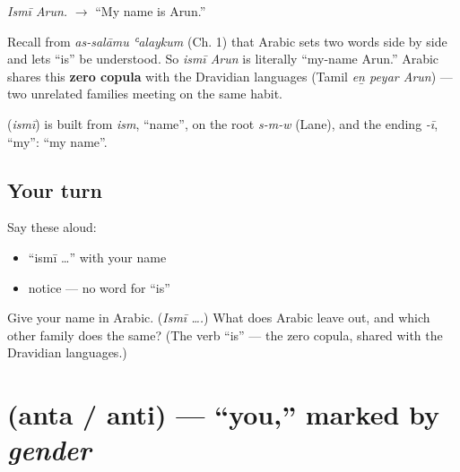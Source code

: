 \emph{Ismī Arun.} $\to$ \textquotedblleft{}My name is Arun.\textquotedblright{}

\begin{grammarlens}[title={Grammar Lens: no word for \textquotedblleft{}is\textquotedblright{} — again}]
Recall from \emph{as-salāmu ʿalaykum} (Ch. 1) that Arabic sets two words side by side and lets \textquotedblleft{}is\textquotedblright{} be understood. So \emph{ismī Arun} is literally \textquotedblleft{}my-name Arun.\textquotedblright{} Arabic shares this \textbf{zero copula} with the Dravidian languages (Tamil \emph{eṉ peyar Arun}) — two unrelated families meeting on the same habit.
\end{grammarlens}

\begin{cousinweb}
\textbf{} (\emph{ismī}) is built from \emph{ism}, \textquotedblleft{}name\textquotedblright{}, on the root \emph{s-m-w} (Lane), and the ending \emph{-ī}, \textquotedblleft{}my\textquotedblright{}: \textquotedblleft{}my name\textquotedblright{}.
\end{cousinweb}

\subsection*{Your turn}
Say these aloud:

\begin{itemize}
\raggedright
  \item \textquotedblleft{}ismī …\textquotedblright{} with your name
  \item notice — no word for \textquotedblleft{}is\textquotedblright{}
\end{itemize}

\begin{tcolorbox}[breakable,colback=teal!4,colframe=teal!35!black,title={Before you move on}]
Give your name in Arabic. (\emph{Ismī ….}) What does Arabic leave out, and which other family does the same? (The verb \textquotedblleft{}is\textquotedblright{} — the zero copula, shared with the Dravidian languages.)
\end{tcolorbox}
\section[\texorpdfstring{\ar{أنت} (anta / anti)}{أنت (anta / anti)}]{ (anta / anti) — \textquotedblleft{}you,\textquotedblright{} marked by \emph{gender}}

\label{lesson:AR-C02-anta-anti}



